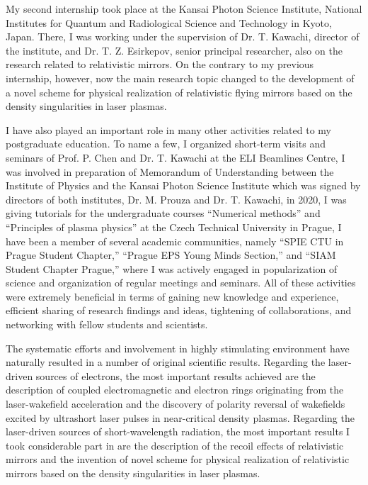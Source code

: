 \documentclass[10pt, a4paper, twoside, openright]{report}
\newcommand{\q}[1]{``#1''} %
\begin{document}

My second internship took place at the Kansai Photon Science Institute, National Institutes for Quantum and Radiological Science and Technology in Kyoto, Japan. There, I was working under the supervision of Dr. T. Kawachi, director of the institute, and Dr. T. Z. Esirkepov, senior principal researcher, also on the research related to relativistic mirrors. On the contrary to my previous internship, however, now the main research topic changed to the development of a novel scheme for physical realization of relativistic flying mirrors based on the density singularities in laser plasmas. 


I have also played an important role in many other activities related to my postgraduate education. To name a few, I organized short-term visits and seminars of Prof. P. Chen and Dr. T. Kawachi at the ELI Beamlines Centre, I was involved in preparation of Memorandum of Understanding between the Institute of Physics and the Kansai Photon Science Institute which was signed by directors of both institutes, Dr. M. Prouza and Dr. T. Kawachi, in 2020, I was giving tutorials for the undergraduate courses \q{Numerical methods} and \q{Principles of plasma physics} at the Czech Technical University in Prague, I have been a member of several academic communities, namely \q{SPIE CTU in Prague Student Chapter,} \q{Prague EPS Young Minds Section,} and \q{SIAM Student Chapter Prague,} where I was actively engaged in popularization of science and organization of regular meetings and seminars. All of these activities were extremely beneficial in terms of gaining new knowledge and experience, efficient sharing of research findings and ideas, tightening of collaborations, and networking with fellow students and scientists.

The systematic efforts and involvement in highly stimulating environment have naturally resulted in a number of original scientific results. Regarding the laser-driven sources of electrons, the most important results achieved are the description of coupled electromagnetic and electron rings originating from the laser-wakefield acceleration and the discovery of polarity reversal of wakefields excited by ultrashort laser pulses in near-critical density plasmas. Regarding the laser-driven sources of short-wavelength radiation, the most important results I took considerable part in are the description of the recoil effects of relativistic mirrors and the invention of novel scheme for physical realization of relativistic mirrors based on the density singularities in laser plasmas. 
\end{document}
